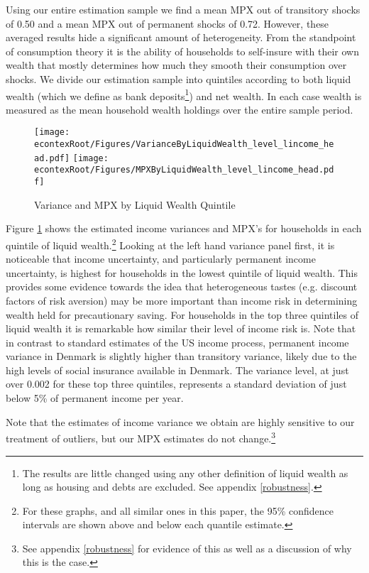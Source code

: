 \documentclass[titlepage]{\econtex}\newcommand{\texname}{ConsumptionHeterogeneity}
\begin{document}
Using our entire estimation sample we find a mean MPX out of transitory shocks of 0.50 and a mean MPX out of permanent shocks of 0.72. However, these averaged results hide a significant amount of heterogeneity. From the standpoint of consumption theory it is the ability of households to self-insure with their own wealth that mostly determines how much they smooth their consumption over shocks. We divide our estimation sample into quintiles according to both liquid wealth (which we define as bank deposits\footnote{The results are little changed using any other definition of liquid wealth as long as housing and debts are excluded. See appendix \ref{robustness}.}) and net wealth. In each case wealth is measured as the mean household wealth holdings over the entire sample period.
\begin{figure}
	\centering
	\texttt{[image: \\econtexRoot/Figures/VarianceByLiquidWealth\_level\_lincome\_head.pdf]}
	\centering
	\texttt{[image: \\econtexRoot/Figures/MPXByLiquidWealth\_level\_lincome\_head.pdf]}
	\caption{Variance and MPX by Liquid Wealth Quintile}
	\label{fig:MPXByLiquidWealth}
\end{figure}

Figure \ref{fig:MPXByLiquidWealth} shows the estimated income variances and MPX's for households in each quintile of liquid wealth.\footnote{For these graphs, and all similar ones in this paper, the 95\% confidence intervals are shown above and below each quantile estimate.} Looking at the left hand variance panel first, it is noticeable that income uncertainty, and particularly permanent income uncertainty, is highest for households in the lowest quintile of liquid wealth. This provides some evidence towards the idea that heterogeneous tastes (e.g. discount factors of risk aversion) may be more important than income risk in determining wealth held for precautionary saving. For households in the top three quintiles of liquid wealth it is remarkable how similar their level of income risk is. Note that in contrast to standard estimates of the US income process, permanent income variance in Denmark is slightly higher than transitory variance, likely due to the high levels of social insurance available in Denmark. The variance level, at just over 0.002 for these top three quintiles, represents a standard deviation of just below 5\% of permanent income per year.

Note that the estimates of income variance we obtain are highly sensitive to our treatment of outliers, but our MPX estimates do not change.\footnote{See appendix \ref{robustness} for evidence of this as well as a discussion of why this is the case.}
\end{document}
